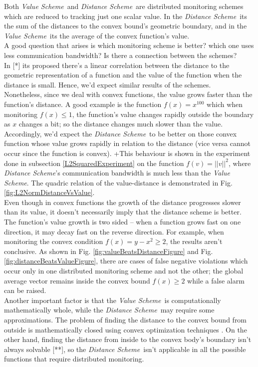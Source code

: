 \documentclass[10pt, conference]{IEEEtran}
\newcommand{\valueScheme}{\textit{Value Scheme}}
\newcommand{\distanceScheme}{\textit{Distance Scheme}}
\begin{document}
Both \valueScheme \ and \distanceScheme \ are distributed monitoring schemes which are reduced to tracking just one scalar value. In the \distanceScheme \ its the sum of the distances to the convex bound's geometric boundary, and in the \valueScheme \ its the average of the convex function's value. \\
A good question that arises is which monitoring scheme is better? which one uses less communication bandwidth? Is there a connection between the schemes? \\
In [*] its proposed there's a linear correlation between the distance to the geometric representation of a function and the value of the function when the distance is small. Hence, we'd expect similar results of the schemes. \\
Nonetheless, since we deal with convex functions, the value grows faster than the function's distance. A good example is the function ${f(x) = x^{100}}$ which  when monitoring ${f(x) \leq 1}$, the function's value changes rapidly outside the boundary as $x$ changes a bit; so the distance changes much slower than the value. Accordingly, we'd expect the \distanceScheme \ to be better on those convex function whose value grows rapidly in relation to the distance (vice versa cannot occur since the function is convex). +This behaviour is shown in the experiment done in subsection \ref{L2SquaredExperiment} on the function ${f(v) = ||v||^2}$, where \distanceScheme 's communication bandwidth is much less than the \valueScheme . The quadric relation of the value-distance is demonstrated in Fig. \ref{fig:L2NormDistanceVsValue}. \\
Even though in convex functions the growth of the distance progresses slower than its value, it doesn't necessarily imply that the distance scheme is better. The function's value growth is two sided -- when a function grows fast on one direction, it may decay fast on the reverse direction. For example, when monitoring the convex condition ${f(x) = y-x^2 \geq 2}$, the results aren't conclusive. As shown in Fig. \ref{fig:valueBeatsDistanceFigure} and Fig. \ref{fig:distanceBeatsValueFigure}, there are cases of false negative violations which occur only in one distributed monitoring scheme and not the other; the global average vector remains inside the convex bound ${f(x) \geq 2}$ while a false alarm can be raised. \\
Another important factor is that the \valueScheme \ is computationally mathematically whole, while the \distanceScheme \ may require some approximations. The problem of finding the distance to the convex bound from outside is mathematically closed using convex optimization techniques \cite{boyd2004convex}. On the other hand, finding the distance from inside to the convex body's boundary isn't always solvable [**], so the \distanceScheme \ isn't applicable in all the possible functions that require distributed monitoring.
\end{document}
